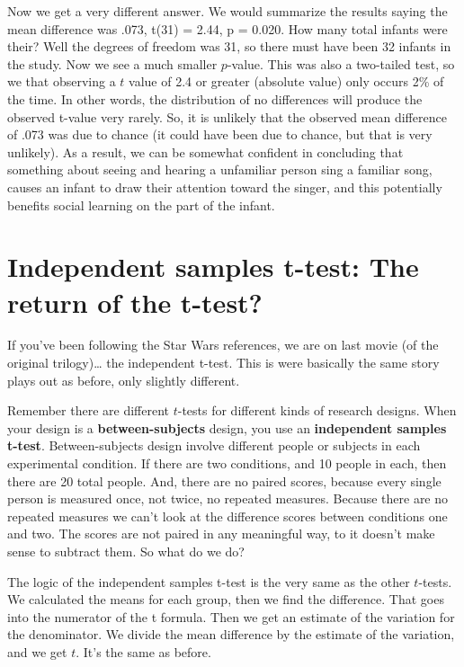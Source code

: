 \documentclass[
]{book}
\begin{document}
Now we get a very different answer. We would summarize the results saying the mean difference was .073, t(31) = 2.44, p = 0.020. How many total infants were their? Well the degrees of freedom was 31, so there must have been 32 infants in the study. Now we see a much smaller \(p\)-value. This was also a two-tailed test, so we that observing a \(t\) value of 2.4 or greater (absolute value) only occurs 2\% of the time. In other words, the distribution of no differences will produce the observed t-value very rarely. So, it is unlikely that the observed mean difference of .073 was due to chance (it could have been due to chance, but that is very unlikely). As a result, we can be somewhat confident in concluding that something about seeing and hearing a unfamiliar person sing a familiar song, causes an infant to draw their attention toward the singer, and this potentially benefits social learning on the part of the infant.

\hypertarget{independent-samples-t-test-the-return-of-the-t-test}{%
\section{Independent samples t-test: The return of the t-test?}\label{independent-samples-t-test-the-return-of-the-t-test}}

If you've been following the Star Wars references, we are on last movie (of the original trilogy)\ldots{} the independent t-test. This is were basically the same story plays out as before, only slightly different.

Remember there are different \(t\)-tests for different kinds of research designs. When your design is a \textbf{between-subjects} design, you use an \textbf{independent samples t-test}. Between-subjects design involve different people or subjects in each experimental condition. If there are two conditions, and 10 people in each, then there are 20 total people. And, there are no paired scores, because every single person is measured once, not twice, no repeated measures. Because there are no repeated measures we can't look at the difference scores between conditions one and two. The scores are not paired in any meaningful way, to it doesn't make sense to subtract them. So what do we do?

The logic of the independent samples t-test is the very same as the other \(t\)-tests. We calculated the means for each group, then we find the difference. That goes into the numerator of the t formula. Then we get an estimate of the variation for the denominator. We divide the mean difference by the estimate of the variation, and we get \(t\). It's the same as before.
\end{document}
